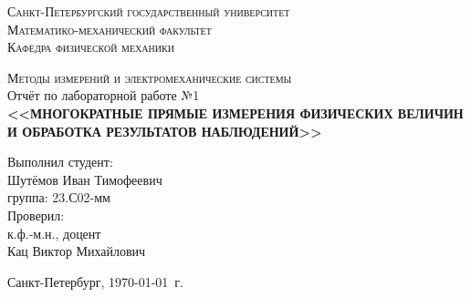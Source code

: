 \begin{titlepage}
\begin{center}
\textsc{Санкт-Петербургский государственный университет\\
Математико-механический факультет\\
Кафедра физической механики\\}

\vfill

\textsc{Методы измерений и электромеханические системы\\[3mm]}
Отчёт по лабораторной работе №1\\[6mm]


\textbf{\large<<МНОГОКРАТНЫЕ ПРЯМЫЕ ИЗМЕРЕНИЯ ФИЗИЧЕСКИХ 
ВЕЛИЧИН И ОБРАБОТКА РЕЗУЛЬТАТОВ НАБЛЮДЕНИЙ>>}

\vfill
\end{center}

\hfill
\begin{minipage}{.5\textwidth}
Выполнил студент:\\[2mm] 
Шутёмов Иван Тимофеевич\\
группа: 23.С02-мм\\[5mm]

Проверил:\\[2mm] 
к.ф.-м.н., доцент\\
Кац Виктор Михайлович
\end{minipage}%
\vfill
\begin{center}
 Санкт-Петербург, \yeardate\today\ г.
\end{center}
\end{titlepage}